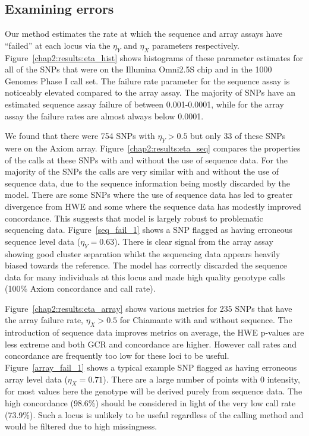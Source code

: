 \clearpage
\subsection{Examining errors}
\label{chap2:results:errors}
Our method estimates the rate at which the sequence and array assays have ``failed'' at each locus via the $\eta_Y$ and $\eta_X$ parameters respectively. Figure~\ref{chap2:results:eta_hist} shows histograms of these parameter estimates for all of the SNPs that were on the Illumina Omni2.5S chip and in the 1000 Genomes Phase I call set. The failure rate parameter for the sequence assay is noticeably elevated compared to the array assay. The majority of SNPs have an estimated sequence assay failure of between 0.001-0.0001, while  for the array assay the failure rates are almost always below 0.0001. 

We found that there were 754 SNPs with  $\eta_Y > 0.5$ but only 33 of these SNPs were on the Axiom array. Figure~\ref{chap2:results:eta_seq}  compares the properties of the calls at these SNPs with and without the use of sequence data. For the majority of the SNPs the calls are very similar with and without the use of sequence data, due to the sequence information being mostly discarded by the model.  There are some SNPs where the use of sequence data has led to greater divergence from HWE and some where the sequence data has modestly improved concordance. This suggests that model is largely robust to problematic sequencing data. Figure~\ref{seq_fail_1} shows a SNP flagged as having erroneous sequence level data ($\eta_Y = 0.63$). There is clear signal from the array assay showing good cluster separation whilst the sequencing data appears heavily biased towards the reference.  The model has correctly discarded the sequence data for many individuals at this locus and made high quality genotype calls (100\% Axiom concordance and call rate).

Figure~\ref{chap2:results:eta_array} shows various metrics for 235 SNPs that have the array failure rate,  $\eta_X > 0.5$ for Chiamante with and without sequence. The introduction of sequence data improves metrics on average, the HWE p-values are less extreme and both GCR and concordance are higher.  However call rates and concordance are frequently too low for these loci to be useful. Figure~\ref{array_fail_1} shows a typical example SNP flagged as having erroneous array level data ($\eta_X = 0.71$). There are a large number of points with 0 intensity, for most values here the genotype will be derived purely from sequence data.  The high concordance (98.6\%) should be considered in light of the very low call rate (73.9\%).  Such a locus is unlikely to be useful regardless of the calling method and would be filtered due to high missingness.

